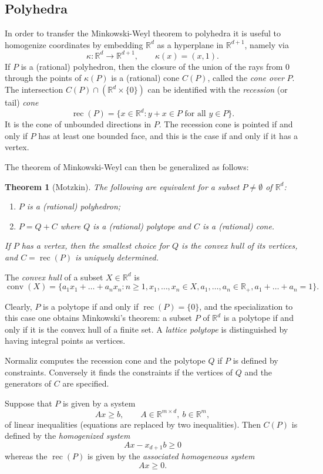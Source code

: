 \documentclass[12pt,a4paper]{scrartcl}
\newtheorem{theorem}{Theorem}
\theoremstyle{definition}
\def\RR{{\mathbb R}}
\DeclareMathOperator{\conv}{conv}
\DeclareMathOperator{\rec}{rec}
\begin{document}
\subsection{Polyhedra}

In order to transfer the Minkowski-Weyl theorem to polyhedra it is useful to homogenize coordinates by embedding $\RR^d$ as a hyperplane in $\RR^{d+1}$, namely via
$$
\kappa:\RR^d\to\RR^{d+1},\qquad \kappa(x)=(x,1).
$$
If $P$ is a (rational) polyhedron, then the closure of the union of the rays from $0$ through the points of $\kappa(P)$ is a (rational) cone $C(P)$, called the \emph{cone over} $P$. The intersection $C(P)\cap(\RR^d\times\{0\})$ can be identified with the \emph{recession} (or tail) \emph{cone}
$$
\rec(P)=\{x\in\RR^d: y+x\in P\text{ for all } y\in P\}.
$$
It is the cone of unbounded directions in $P$. The recession cone is pointed if and only if $P$ has at least one bounded face, and this is the case if and only if it has a vertex.

The theorem of Minkowski-Weyl can then be generalized as follows:

\begin{theorem}[Motzkin]
	The following are equivalent for a subset $P\neq\emptyset$  of $\RR^d$:
	\begin{enumerate}
		\item $P$ is a (rational) polyhedron;
		\item $P=Q+C$ where $Q$ is a (rational) polytope and $C$ is a (rational) cone.
	\end{enumerate}
	If $P$ has a vertex, then the smallest choice for $Q$ is the convex hull of its vertices, and $C=\rec(P)$ is uniquely determined.
\end{theorem}

The \emph{convex hull} of a subset $X\in\RR^d$ is
$$
\conv(X)=\{a_1x_1+\dots+a_nx_n: n\ge 1, x_1,\dots,x_n\in X, a_1,\dots,a_n\in\RR_+, a_1+\dots+a_n=1\}.
$$

Clearly, $P$ is a polytope if and only if $\rec(P)=\{0\}$, and the specialization to this case one obtains Minkowski's theorem: a subset $P$ of $\RR^d$ is a polytope if and only if it is the convex hull of a finite set. A \emph{lattice polytope} is distinguished by having integral points as vertices.

Normaliz computes the recession cone and the polytope $Q$ if $P$ is defined by constraints. Conversely it finds the constraints if the vertices of $Q$ and the generators of $C$ are specified.

Suppose that $P$ is given by a system
$$
Ax\ge b, \qquad A\in\RR^{m\times d},\ b\in \RR^m,
$$
of linear inequalities (equations are replaced by two inequalities). Then $C(P)$ is defined by the \emph{homogenized system}
$$
Ax-x_{d+1}b\ge 0
$$
whereas the $\rec(P)$ is given by the \emph{associated homogeneous system}
$$
Ax\ge 0.
$$
\end{document}
